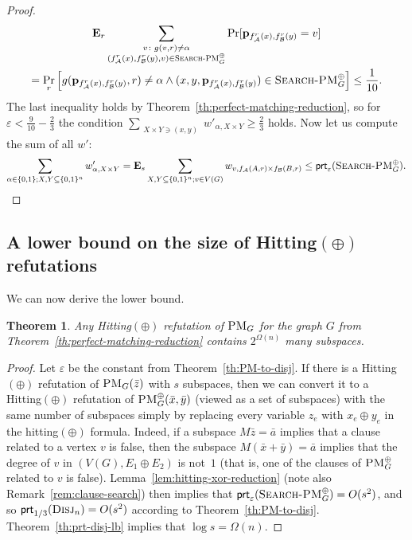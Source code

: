 \documentclass[11pt]{article}
\newcommand{\scterm}[1]{{\textrm{\sc #1}}}
\newcommand{\hit}{\scterm{Hitting}}
\newcommand{\hitp}{{\hit}$(\oplus)$}
\newcommand{\prt}{\mathsf{prt}}
\newcommand{\disj}{\scterm{Disj}}
\newcommand{\PM}{\scterm{PM}}
\newcommand{\forxorPM}{\textsc{PM}^\oplus}
\newcommand{\xorPM}{\textsc{Search-PM}^\oplus}
\newcommand{\Alice}{\mathcal{A}}
\newcommand{\Bob}{\mathcal{B}}
\newcommand{\E}{\mathbf{E}}
\numberwithin{equation}{section}
\newtheorem{theorem}{Theorem}[section]
\begin{document}
\begin{proof}
\begin{multline*}    
\E_r \sum_{\substack{v\colon g(v, r) \neq \alpha \\ (f_{\Alice}^r(x), f_{\Bob}^r(y),v) \in \xorPM_G}} \Pr[\mathbf{p}_{f_{\Alice}^r(x), f_{\Bob}^r(y)}=v] \\=\Pr_r\left[g(\mathbf{p}_{f_{\Alice}^r(x), f_{\Bob}^r(y)}, r) \neq \alpha \land (x,y,\mathbf{p}_{f_{\Alice}^r(x), f_{\Bob}^r(y)}) \in \xorPM_G\right] 
    \le\frac{1}{10}.
\end{multline*}
The last inequality holds by Theorem~\ref{th:perfect-matching-reduction}, so for $\varepsilon < \frac{9}{10} - \frac{2}{3}$ the condition $\sum\limits_{\substack{ X \times Y \ni (x, y)}} w'_{\alpha, X \times Y} \ge \frac23 $ holds. Now let us compute the sum of all $w'$:
\[ \sum_{\alpha \in \{0,1\}; X, Y \subseteq \{0,1\}^{n}} w'_{\alpha, X \times Y} = \E_s  \sum_{X, Y \subseteq \{0,1\}^n; v \in V(G)} w_{v, f_{\Alice}(A,r) \times f_{\Bob}(B,r)}   \le \prt_\varepsilon (\xorPM_G). \qedhere\]

\end{proof}

\subsection{A lower bound on the size of \texorpdfstring{{\hitp}}{Hitting(xor)} refutations}
We can now derive the lower bound. 

\begin{theorem}\label{th:hitting-plus-lb-pm}
Any {\hitp} refutation of $\PM_G$ for the graph $G$ from Theorem~\ref{th:perfect-matching-reduction} contains $2^{\Omega(n)}$ many subspaces.
\end{theorem}
\begin{proof}
Let $\varepsilon$ be the constant from Theorem~\ref{th:PM-to-disj}. If there is a {\hitp}
refutation of $\PM_G(\bar{z})$ with $s$ subspaces, then we can convert it to 
a {\hitp} refutation of $\forxorPM_G(\bar{x},\bar{y})$ (viewed
as a set of subspaces) with the same number of subspaces
simply by replacing every variable $z_e$ with $x_e\oplus y_e$
in the hitting$(\oplus)$ formula.
Indeed, if a subspace $M\bar{z}=\bar{a}$ implies that 
a clause related to a vertex $v$ is false, 
then the subspace $M(\bar{x}+\bar{y})=\bar{a}$ 
implies that the degree of $v$ in $(V(G),E_1 \oplus E_2)$ is not~$1$
(that is, one of the clauses of $\forxorPM_G$ related to $v$ is false).
Lemma~\ref{lem:hitting-xor-reduction} (note also Remark~\ref{rem:clause-search})
then implies that 
$\prt_\varepsilon(\xorPM_G) = O(s^2)$, and so 
$\prt_{1/3}(\disj_n) = O(s^2)$ according to Theorem~\ref{th:PM-to-disj}. 
Theorem~\ref{th:prt-disj-lb} implies that $\log s = \Omega(n)$.
\end{proof}
\end{document}
